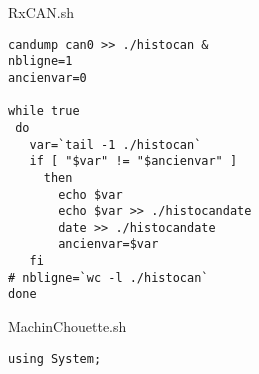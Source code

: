 \begin{center}\HRule \end{center}
\begin{center}
RxCAN.sh
\end{center}
\begin{lstlisting}
candump can0 >> ./histocan &
nbligne=1
ancienvar=0
  
while true
 do
   var=`tail -1 ./histocan`
   if [ "$var" != "$ancienvar" ]
     then
       echo $var
       echo $var >> ./histocandate
       date >> ./histocandate
       ancienvar=$var
   fi
# nbligne=`wc -l ./histocan` 
done

\end{lstlisting}

\begin{center}\HRule \end{center}
\begin{center}
MachinChouette.sh
\end{center}
\begin{lstlisting}
using System;
\end{lstlisting}
